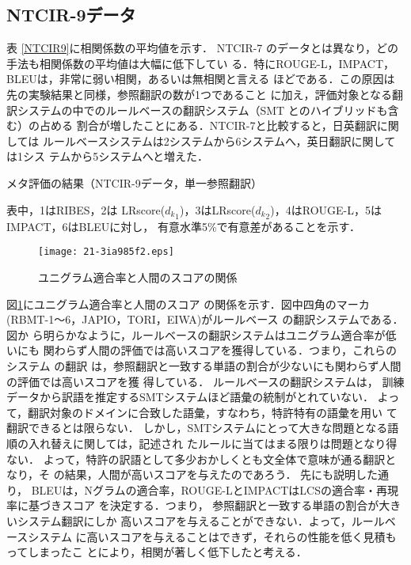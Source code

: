 \documentclass[japanese]{jnlp_1.4}
\begin{document}
\subsection{NTCIR-9データ}

表 \ref{NTCIR9}に相関係数の平均値を示す．
NTCIR-7 のデータとは異なり，どの手法も相関係数の平均値は大幅に低下してい
る．特にROUGE-L，IMPACT，BLEUは，非常に弱い相関，あるいは無相関と言える
ほどである．この原因は先の実験結果と同様，参照翻訳の数が1つであること
に加え，評価対象となる翻訳システムの中でのルールベースの翻訳システム（SMT
とのハイブリッドも含む）の占める
割合が増したことにある．NTCIR-7と比較すると，日英翻訳に関しては
ルールベースシステムは2システムから6システムへ，英日翻訳に関しては1シス
テムから5システムへと増えた．

\begin{table}[t]
  \caption{メタ評価の結果（NTCIR-9データ，単一参照翻訳）}
  \label{NTCIR9}

\vspace{4pt}\small
表中，1はRIBES，2は
  LRscore(${d_k}_1$)，3はLRscore(${d_k}_2$)，4はROUGE-L，5はIMPACT，6はBLEUに対し，
  有意水準5\%で有意差があることを示す．
\par
\end{table}
\begin{figure}[t]
   \begin{center}
\texttt{[image: 21-3ia985f2.eps]}
   \end{center}
    \caption{ユニグラム適合率と人間のスコアの関係}
    \label{uniprec}
\end{figure}

図\ref{uniprec}にユニグラム適合率と人間のスコア
の関係を示す．図中四角のマーカ(RBMT-1〜6，JAPIO，TORI，EIWA)がルールベース
の翻訳システムである．図か
ら明らかなように，ルールベースの翻訳システムはユニグラム適合率が低いにも
関わらず人間の評価では高いスコアを獲得している．つまり，これらのシステム
の翻訳
は，参照翻訳と一致する単語の割合が少ないにも関わらず人間の評価では高いスコアを獲
得している．
ルールベースの翻訳システムは，
訓練データから訳語を推定するSMTシステムほど語彙の統制がとれていない．
よって，翻訳対象のドメインに合致した語彙，すなわち，特許特有の語彙を用い
て翻訳できるとは限らない．
しかし，SMTシステムにとって大きな問題となる語順の入れ替えに関しては，記述され
たルールに当てはまる限りは問題となり得ない．
よって，特許の訳語として多少おかしくとも文全体で意味が通る翻訳となり，そ
の結果，人間が高いスコアを与えたのであろう．
先にも説明した通り，
BLEUは，Nグラムの適合率，ROUGE-LとIMPACTはLCSの適合率・再現率に基づきスコア
を決定する．つまり，
参照翻訳と一致する単語の割合が大きいシステム翻訳にしか
高いスコアを与えることができない．よって，ルールベースシステム
に高いスコアを与えることはできず，それらの性能を低く見積もってしまったこ
とにより，相関が著しく低下したと考える．
\end{document}
